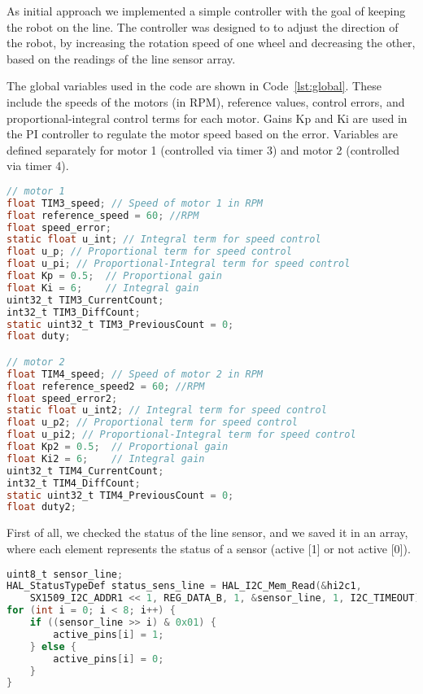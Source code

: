 As initial approach we implemented a simple controller with the goal of keeping the robot on the line.
The controller was designed to to adjust the direction of the robot, by increasing the rotation speed of one wheel and decreasing the other, based on the readings of the line sensor array.

The global variables used in the code are shown in Code~\ref{lst:global}. 
These include the speeds of the motors (in RPM), reference values, control errors, and proportional-integral control terms for each motor. 
Gains Kp and Ki are used in the PI controller to regulate the motor speed based on the error. 
Variables are defined separately for motor 1 (controlled via timer 3) and motor 2 (controlled via timer 4).
\begin{lstlisting}[language=C, caption={Global variables}, label={lst:global}]
// motor 1
float TIM3_speed; // Speed of motor 1 in RPM
float reference_speed = 60; //RPM
float speed_error; 
static float u_int; // Integral term for speed control
float u_p; // Proportional term for speed control
float u_pi; // Proportional-Integral term for speed control
float Kp = 0.5;  // Proportional gain
float Ki = 6;    // Integral gain
uint32_t TIM3_CurrentCount;
int32_t TIM3_DiffCount;
static uint32_t TIM3_PreviousCount = 0;
float duty;

// motor 2
float TIM4_speed; // Speed of motor 2 in RPM
float reference_speed2 = 60; //RPM
float speed_error2;
static float u_int2; // Integral term for speed control
float u_p2; // Proportional term for speed control
float u_pi2; // Proportional-Integral term for speed control
float Kp2 = 0.5;  // Proportional gain
float Ki2 = 6;    // Integral gain
uint32_t TIM4_CurrentCount;
int32_t TIM4_DiffCount;
static uint32_t TIM4_PreviousCount = 0;
float duty2;
\end{lstlisting}

First of all, we checked the status of the line sensor, and we saved it in an array, where each element represents the status of a sensor (active [1] or not active [0]).
\begin{lstlisting}[language=C, caption={Status sensor line}, label={lst:sens_line}]
uint8_t sensor_line;
HAL_StatusTypeDef status_sens_line = HAL_I2C_Mem_Read(&hi2c1,
    SX1509_I2C_ADDR1 << 1, REG_DATA_B, 1, &sensor_line, 1, I2C_TIMEOUT);
for (int i = 0; i < 8; i++) {
    if ((sensor_line >> i) & 0x01) {
        active_pins[i] = 1;
    } else {
        active_pins[i] = 0;
    }
}
\end{lstlisting}

